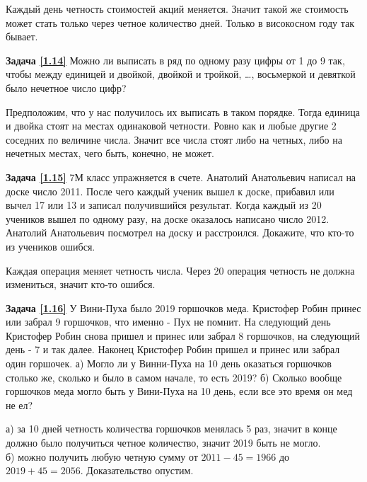 \begin{prf}
	Каждый день четность стоимостей акций меняется. Значит такой же стоимость может стать только через четное количество дней. Только в високосном году так бывает.
\end{prf}

\textbf{Задача \ref{1.14}} Можно ли выписать в ряд по одному разу цифры от 1 до 9 так, чтобы между единицей и двойкой, двойкой и тройкой, \dots, восьмеркой и девяткой было нечетное число цифр?

\begin{prf}
	Предположим, что у нас получилось их выписать в таком порядке. Тогда единица и двойка стоят на местах одинаковой четности. Ровно как и любые другие 2 соседних по величине числа. Значит все числа стоят либо на четных, либо на нечетных местах, чего быть, конечно, не может.
\end{prf}


\textbf{Задача \ref{1.15}} 7М класс упражняется в счете. Анатолий Анатольевич написал на доске число 2011. После чего каждый ученик вышел к доске, прибавил или вычел 17 или 13 и записал получившийся результат. Когда каждый из 20 учеников вышел по одному разу, на доске оказалось написано число 2012. Анатолий Анатольевич посмотрел на доску и расстроился. Докажите, что кто-то из учеников ошибся.

\begin{prf}
	Каждая операция меняет четность числа. Через 20 операция четность не должна измениться, значит кто-то ошибся.
\end{prf}


\textbf{Задача \ref{1.16}}
	У Вини-Пуха было 2019 горшочков меда. Кристофер Робин принес или забрал 9 горшочков, что именно - Пух не помнит. На следующий день Кристофер Робин снова пришел и принес или забрал 8 горшочков, на следующий день - 7 и так далее. Наконец Кристофер Робин пришел и принес или забрал один горшочек.  а) Могло ли у Винни-Пуха на 10 день оказаться горшочков столько же, сколько и было в самом начале, то есть 2019? б) Сколько вообще горшочков меда могло быть у Вини-Пуха на 10 день, если все это время он мед не ел?

\begin{prf}
	а) за 10 дней четность количества горшочков менялась 5 раз, значит в конце должно было получиться четное количество, значит 2019 быть не могло.\\
	б) можно получить любую четную сумму от $2011-45=1966$ до $2019+45=2056$. Доказательство опустим. 
\end{prf}

